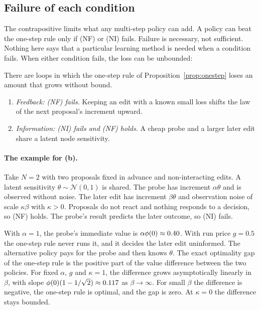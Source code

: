 \subsection{Failure of each condition}

The contrapositive limits what any multi-step policy can add. A policy can beat the one-step rule only if (NF) or (NI) fails. Failure is necessary, not sufficient. Nothing here says that a particular learning method is needed when a condition fails. When either condition fails, the loss can be unbounded:

\begin{proposition}\label{prop:failures}
There are loops in which the one-step rule of Proposition~\ref{prop:onestep} loses an amount that grows without bound.
\begin{enumerate}
\item[(a)] \emph{Feedback: (NF) fails.} Keeping an edit with a known small loss shifts the law of the next proposal's increment upward.
\item[(b)] \emph{Information: (NI) fails and (NF) holds.} A cheap probe and a larger later edit share a latent node sensitivity.
\end{enumerate}
\end{proposition}

\paragraph{The example for (b).}
Take $N=2$ with two proposals fixed in advance and non-interacting edits. A latent sensitivity $\theta\sim\mathcal{N}(0,1)$ is shared. The probe has increment $\alpha\theta$ and is observed without noise. The later edit has increment $\beta\theta$ and observation noise of scale $\kappa\beta$ with $\kappa>0$. Proposals do not react and nothing responds to a decision, so (NF) holds. The probe's result predicts the later outcome, so (NI) fails.

With $\alpha=1$, the probe's immediate value is $\alpha\phi(0)\approx0.40$. With run price $g=0.5$ the one-step rule never runs it, and it decides the later edit uninformed. The alternative policy pays for the probe and then knows $\theta$. The exact optimality gap of the one-step rule is the positive part of the value difference between the two policies. For fixed $\alpha$, $g$ and $\kappa=1$, the difference grows asymptotically linearly in $\beta$, with slope $\phi(0)(1-1/\sqrt{2})\approx0.117$ as $\beta\to\infty$. For small $\beta$ the difference is negative, the one-step rule is optimal, and the gap is zero. At $\kappa=0$ the difference stays bounded.

